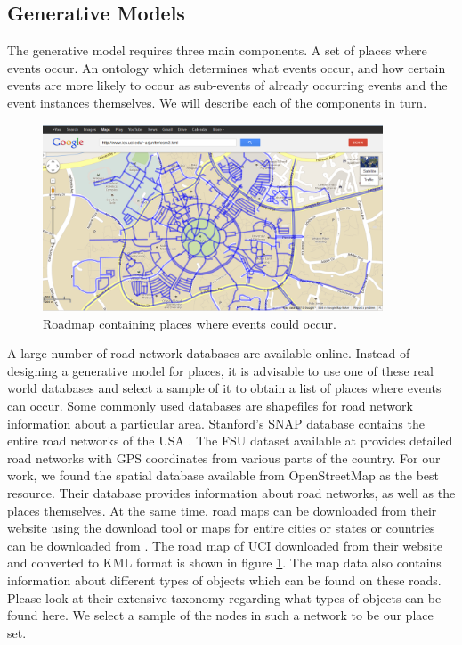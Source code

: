 \subsection{Generative Models}
The generative model requires three main components. A set of places where events occur. An ontology which determines what events occur, and how certain events are more likely to occur as sub-events of already occurring events and the event instances themselves. We will describe each of the components in turn. 


\begin{figure}[t]
\centering
\includegraphics[width=0.9\textwidth]{media/chapter5/perf/map-locations.png}
\caption{Roadmap containing places where events could occur.}
\label{fig:osm-roadmap-uci}
\end{figure}

A large number of road network databases are available online. Instead of designing a generative model for places, it is advisable to use one of these real world databases and select a sample of it to obtain a list of places where events can occur. Some commonly used databases are shapefiles \cite{esri:tigerline} for road network information about a particular area. Stanford's SNAP database contains the entire road networks of the USA \cite{stanford:snap}. The FSU dataset available at \cite{fsu:spatial} provides detailed road networks with GPS coordinates from various parts of the country. For our work, we found the spatial database available from OpenStreetMap as the best resource. Their database provides information about road networks, as well as the places themselves. At the same time, road maps can be downloaded from their website using the download tool or maps for entire cities or states or countries can be downloaded from \cite{cloudmade:download}. The road map of UCI downloaded from their website and converted to KML format is shown in figure \ref{fig:osm-roadmap-uci}. The map data also contains information about different types of objects which can be found on these roads. Please look at their extensive taxonomy \cite{osm:taxonomy} regarding what types of objects can be found here. We select a sample of the nodes in such a network to be our place set.


